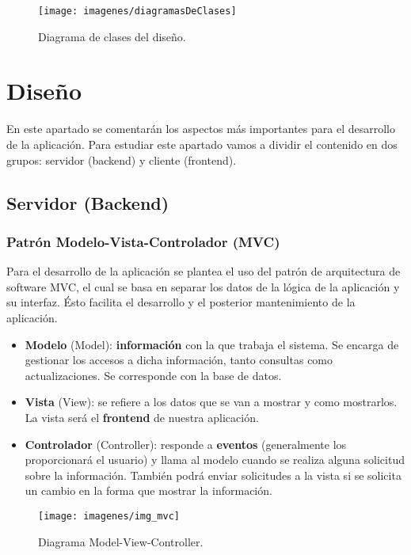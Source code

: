 \begin{figure}[H]
	\centering
	\texttt{[image: imagenes/diagramasDeClases]}
	\caption{Diagrama de clases del diseño.}
	\label{fig:diagramasDeClases}
\end{figure}

\newpage
\section{Diseño}
En este apartado se comentarán los aspectos más importantes para el desarrollo de la aplicación. Para estudiar este apartado vamos a dividir el contenido en dos grupos: servidor (backend) y cliente (frontend).
\subsection{Servidor (Backend)}

\hfill\begin{minipage}{\dimexpr\textwidth-1cm}
	\subsubsection{Patrón Modelo-Vista-Controlador (MVC)}
	Para el desarrollo de la aplicación se plantea el uso del patrón de arquitectura de software MVC, el cual se basa en separar los datos de la lógica de la aplicación y su interfaz. Ésto facilita el desarrollo y el posterior mantenimiento de la aplicación.
	\begin{itemize}
		\item \textbf{Modelo} (Model): \textbf{información} con la que trabaja el sistema. Se encarga de gestionar los accesos a dicha información, tanto consultas como actualizaciones. Se corresponde con la base de datos.
		\item \textbf{Vista} (View): se refiere a los datos que se van a mostrar y como mostrarlos. La vista será el \textbf{frontend} de nuestra aplicación.
		\item \textbf{Controlador} (Controller): responde a \textbf{eventos} (generalmente los proporcionará el usuario) y llama al modelo cuando se realiza alguna solicitud sobre la información. También podrá enviar solicitudes a la vista si se solicita un cambio en la forma que mostrar la información. \\
	\end{itemize}
	
	\begin{figure}[H]
		\centering
		\texttt{[image: imagenes/img\_mvc]}
		\caption{Diagrama Model-View-Controller.}
		\label{fig:img_mvc}
	\end{figure}
\end{minipage}


